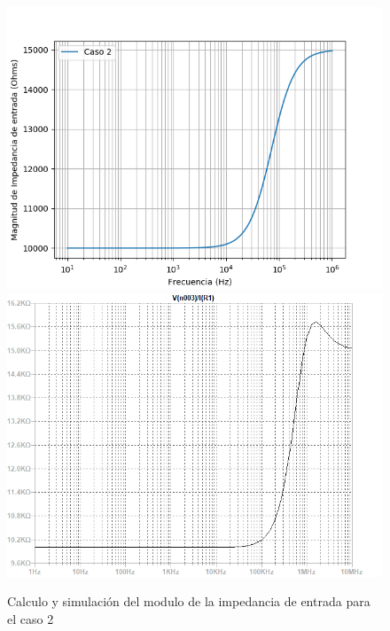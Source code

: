 \begin{figure}[H]
\begin{centering}
\includegraphics[scale=0.5]{../Ex1/iA/Resources1a/zinpm2}\includegraphics[scale=0.4]{../Ex1/iA/Resources1a/zinpm2_sim}
\par\end{centering}
\caption{Calculo y simulación del modulo de la impedancia de entrada para el
caso 2}
\end{figure}

